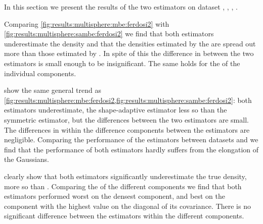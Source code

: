 










\oldStuff

	In this section we present the results of the two estimators on dataset \ferdosiTwo, \baakmanTwo, \ferdosiThree, \baakmanThree.

	Comparing \cref{fig:results:multisphere:mbe:ferdosi2} with \cref{fig:results:multisphere:sambe:ferdosi2} we find that both estimators underestimate the density and that the densities estimated by the \sambe are spread out more than those estimated by \mbe. In spite of this the difference in \mse between the two estimators is small enough to be insignificant. 
	The same holds for the \mse of the individual components.

	 show the same general trend as \cref{fig:results:multisphere:mbe:ferdosi2,fig:results:multisphere:sambe:ferdosi2}: both estimators underestimate, the shape-adaptive estimator less so than the symmetric estimator, but the differences between the two estimators are small. 
	The differences in \MSE within the difference components between the estimators are negligible. 
	Comparing the performance of the estimators between datasets \ferdosiTwo and \baakmanTwo we find that the performance of both estimators hardly suffers from the elongation of the Gaussians. 

	 clearly show that both estimators significantly underestimate the true density, \sambe more so than \mbe. 
	Comparing the \mse of the different components we find that both estimators performed worst on the densest component, and best on the component with the highest value on the diagonal of its covariance. There is no significant difference between the estimators within the different components. 

